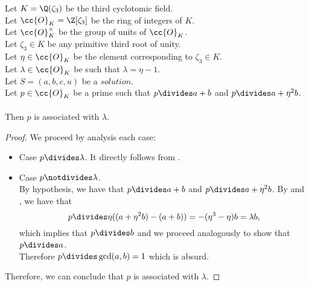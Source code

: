 \begin{lemma}
  \label{lmm:associated_of_dvd_a_add_b_of_dvd_a_add_eta_sq_mul_b}
  \leanok
  Let $K = \Q(\zeta_3)$ be the third cyclotomic field. \\
  Let $\cc{O}_K = \Z[\zeta_3]$ be the ring of integers of $K$. \\
  Let $\cc{O}^\times_K$ be the group of units of $\cc{O}_K$. \\
  Let $\zeta_3 \in K$ be any primitive third root of unity. \\
  Let $\eta \in \cc{O}_K$ be the element corresponding to $\zeta_3 \in K$. \\
  Let $\lambda \in \cc{O}_K$ be such that $\lambda = \eta -1$. \\
  Let $S=(a, b, c, u)$ be a $solution$.\\
  Let $p \in \cc{O}_K$ be a prime such that $p \divides a+b$
  and $p \divides a+\eta^2  b$.\\\\
  Then $p$ is associated with $\lambda$.
\end{lemma}
\begin{proof}
  \leanok
  We proceed by analysis each case:
  \begin{itemize}
      \item Case $p \divides \lambda$. It directly follows from .
      \item Case $p \notdivides \lambda$. \\
            By hypothesis, we have that $p \divides a+ b$ and $p \divides a+\eta^2 b$.
            By  and , we have that
            $$p \divides \eta ((a+\eta^2 b) - (a+ b)) = - (\eta^3 - \eta) b = \lambda b,$$
            which implies that $p \divides b$
            and we proceed analogously to show that $p \divides a$.\\
            Therefore $p \divides \gcd(a,b)=1$ which is absurd.
  \end{itemize}
  Therefore, we can conclude that $p$ is associated with $\lambda$.
\end{proof}

